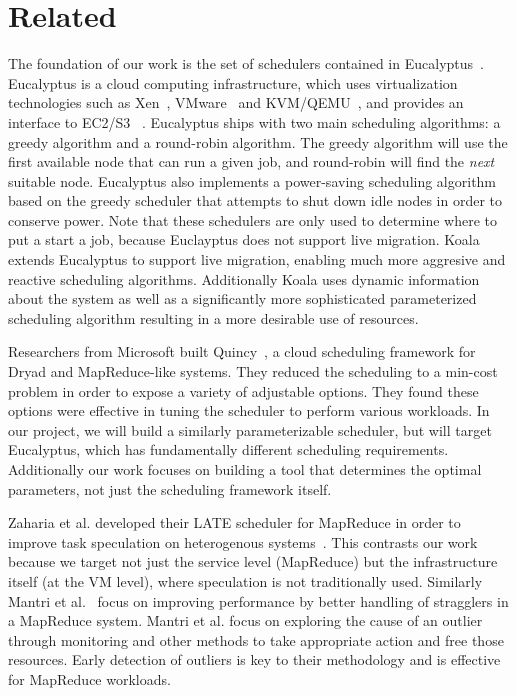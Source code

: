 \section{Related}

The foundation of our work is the set of schedulers contained in
Eucalyptus~\cite{Eucalyptus}.  Eucalyptus is a cloud computing infrastructure,
which uses virtualization technologies such as Xen~\cite{Xen},
VMware~\cite{VMware} and KVM/QEMU~\cite{QEMU}, and provides an interface to
EC2/S3 ~\cite{AWS}.   Eucalyptus ships with two main scheduling algorithms: a
greedy algorithm and a round-robin algorithm.  The greedy algorithm will use the
first available node that can run a given job, and round-robin will find the
\emph{next} suitable node.  Eucalyptus also implements a power-saving scheduling
algorithm based on the greedy scheduler that attempts to shut down idle nodes in
order to conserve power.  Note that these schedulers are only used to determine
where to put a start a job, because Euclayptus does not support live migration.
Koala extends Eucalyptus to support live migration, enabling much more aggresive
and reactive scheduling algorithms.  Additionally Koala uses dynamic information
about the system as well as a significantly more sophisticated parameterized
scheduling algorithm resulting in a more desirable use of resources.

Researchers from Microsoft built Quincy~\cite{Quincy}, a cloud scheduling
framework for Dryad and MapReduce-like systems.  They reduced the scheduling to
a min-cost problem in order to expose a variety of adjustable options.  They
found these options were effective in tuning the scheduler to perform various
workloads.  In our project, we will build a similarly parameterizable scheduler,
but will target Eucalyptus, which has fundamentally different scheduling
requirements.  Additionally our work focuses on building a tool that determines
the optimal parameters, not just the scheduling framework itself.

Zaharia et al. developed their LATE scheduler for MapReduce in order to improve
task speculation on heterogenous systems~\cite{Zaharia}.  This contrasts our
work because we target not just the service level (MapReduce) but the
infrastructure itself (at the VM level), where speculation is not traditionally
used.  Similarly Mantri et al.~\cite{Mantri} focus on improving performance by
better handling of stragglers  in a MapReduce system.  Mantri et al. focus on
exploring the cause of an outlier through monitoring and other methods to take
appropriate action and free those resources.  Early detection of outliers is key
to their methodology and is effective for MapReduce workloads.

